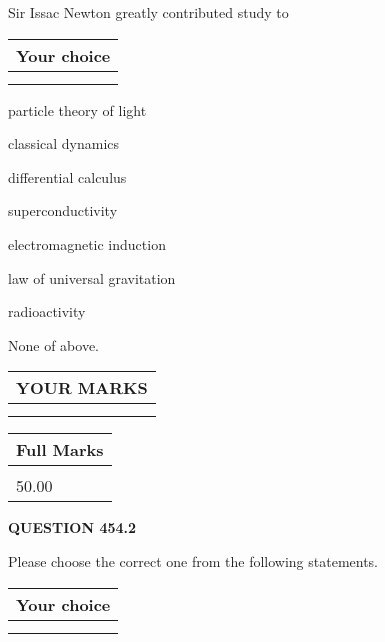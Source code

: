 \documentclass[12pt]{article}
\begin{document}
  
Sir Issac Newton greatly contributed study to
  
  
\noindent\hspace{3.0in} \begin{tabular}{|l|}
\hline
Your choice \\
\hline
 \\ 
 \\ 
\hline
\end{tabular}
  
  
 
 
particle theory of light
 
 
classical dynamics
 
 
differential calculus
 
 
superconductivity
 
 
electromagnetic induction
 
 
law of universal gravitation
 
 
radioactivity
 
 
 None of above.
 
 
  
\vspace{0.2in}
  
\noindent\begin{tabular}{|l|}
\hline
 YOUR MARKS  \\
\hline
 \\ 
 \\ 
\hline
\end{tabular}
\hspace{0.05in} \begin{tabular}{|l|}
\hline
 Full Marks  \\
\hline
 \\ 
50.00 \\
\hline
\end{tabular}
{\textbf{\Large{QUESTION
454.2 
}}}
  
  
Please choose the correct one from the following statements.
  
  
\noindent\hspace{3.0in} \begin{tabular}{|l|}
\hline
Your choice \\
\hline
 \\ 
 \\ 
\hline
\end{tabular}
  
\end{document}
